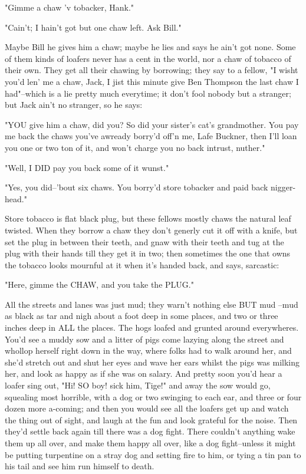 "Gimme a chaw 'v tobacker, Hank."

"Cain't; I hain't got but one chaw left.  Ask Bill."

Maybe Bill he gives him a chaw; maybe he lies and says he ain't got none.
Some of them kinds of loafers never has a cent in the world, nor a chaw
of tobacco of their own.  They get all their chawing by borrowing; they
say to a fellow, "I wisht you'd len' me a chaw, Jack, I jist this minute
give Ben Thompson the last chaw I had"--which is a lie pretty much
everytime; it don't fool nobody but a stranger; but Jack ain't no
stranger, so he says:

"YOU give him a chaw, did you?  So did your sister's cat's grandmother.
You pay me back the chaws you've awready borry'd off'n me, Lafe Buckner,
then I'll loan you one or two ton of it, and won't charge you no back
intrust, nuther."

"Well, I DID pay you back some of it wunst."

"Yes, you did--'bout six chaws.  You borry'd store tobacker and paid back
nigger-head."

Store tobacco is flat black plug, but these fellows mostly chaws the
natural leaf twisted.  When they borrow a chaw they don't generly cut it
off with a knife, but set the plug in between their teeth, and gnaw with
their teeth and tug at the plug with their hands till they get it in two;
then sometimes the one that owns the tobacco looks mournful at it when
it's handed back, and says, sarcastic:

"Here, gimme the CHAW, and you take the PLUG."

All the streets and lanes was just mud; they warn't nothing else BUT mud
--mud as black as tar and nigh about a foot deep in some places, and two
or three inches deep in ALL the places.  The hogs loafed and grunted
around everywheres.  You'd see a muddy sow and a litter of pigs come
lazying along the street and whollop herself right down in the way, where
folks had to walk around her, and she'd stretch out and shut her eyes and
wave her ears whilst the pigs was milking her, and look as happy as if
she was on salary. And pretty soon you'd hear a loafer sing out, "Hi!  SO
boy! sick him, Tige!" and away the sow would go, squealing most horrible,
with a dog or two swinging to each ear, and three or four dozen more
a-coming; and then you would see all the loafers get up and watch the thing
out of sight, and laugh at the fun and look grateful for the noise.  Then
they'd settle back again till there was a dog fight.  There couldn't
anything wake them up all over, and make them happy all over, like a dog
fight--unless it might be putting turpentine on a stray dog and setting
fire to him, or tying a tin pan to his tail and see him run himself to
death.


